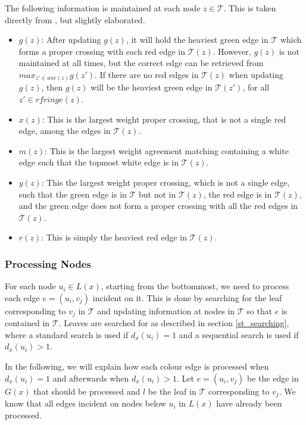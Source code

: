 The following information is maintained at each node $z \in \mathcal{T}$. This is taken directly from \cite{nlogn}, but slightly elaborated.
\begin{itemize}
	\item $g(z)$: After updating $g(z)$, it will hold the heaviest green edge in $\mathcal{T}$ which	forms a proper crossing with each red edge in $\mathcal{T}(z)$.
	\subitem However, $g(z)$ is not maintained at all times, but the correct edge can be retrieved from $max_{z' \in anc(z)}g(z')$.
	\subitem If there are no red edges in $\mathcal{T}(z)$ when updating $g(z)$, then $g(z)$ will be the heaviest green edge in $\mathcal{T}(z')$, for all $z' \in rfringe(z)$.
	\item $x(z)$: This is the largest weight proper crossing, that is not a single red edge, among the edges in $\mathcal{T}(z)$.
	\item $m(z)$: This is the largest weight agreement matching containing a white edge
	such that the topmost white edge is in $\mathcal{T}(z)$.
	\item $y(z)$: This the largest weight proper crossing, which is not a single edge, such that the green edge is in $\mathcal{T}$ but not in $\mathcal{T}(z)$, the red edge is in $\mathcal{T}(z)$, and the green edge does not form a proper crossing with all the red edges in $\mathcal{T}(z)$.
	\item $r(z)$: This is simply the heaviest red edge in $\mathcal{T}(z)$.
\end{itemize}

\subsubsection{Processing Nodes}
For each node $u_i \in L(x)$, starting from the bottommost, we need to process each edge $e = (u_i, v_j)$ incident on it. This is done by searching for the leaf corresponding to $v_j$ in $\mathcal{T}$ and updating information at nodes in $\mathcal{T}$ so that $e$ is contained in $\mathcal{T}$. Leaves are searched for as described in section \ref{st_searching}, where a standard search is used if $d_x(u_i) = 1$ and a sequential search is used if $d_x(u_i) > 1$.

In the following, we will explain how each colour edge is processed when $d_x(u_i) = 1$ and afterwards when $d_x(u_i) > 1$. Let $e=(u_i,v_j)$ be the edge in $G(x)$ that should be processed and $l$ be the leaf in $\mathcal{T}$ corresponding to $v_j$. We know that all edges incident on nodes below $u_i$ in $L(x)$ have already been processed.

